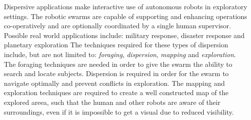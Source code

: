 
  Dispersive applications make interactive use of autonomous robots in exploratory settings. The robotic swarms are capable of supporting and enhancing operations co-operatively and are optionally coordinated by a single human supervisor. Possible real world applications include: military response, disaster response and planetary exploration\cite{ludwig2006robotic,Penders2011}
    The techniques required for these types of dispersion include, but are not limited to: \emph{foraging}, \emph{dispersion}, \emph{mapping}  and \emph{exploration}.\cite{morlok2007dispersing,Penders2011,mclurkin2007distributed} The foraging techniques are needed in order to give the swarm the ability to search and locate subjects. Dispersion is required in order for the swarm to navigate optimally and prevent conflicts in exploration. The mapping and exploration techniques are required to create a well constructed map of the explored areea, such that the human and other robots are aware of their surroundings, even if it is impossible to get a visual due to reduced visibility.\cite{morlok2007dispersing}
    